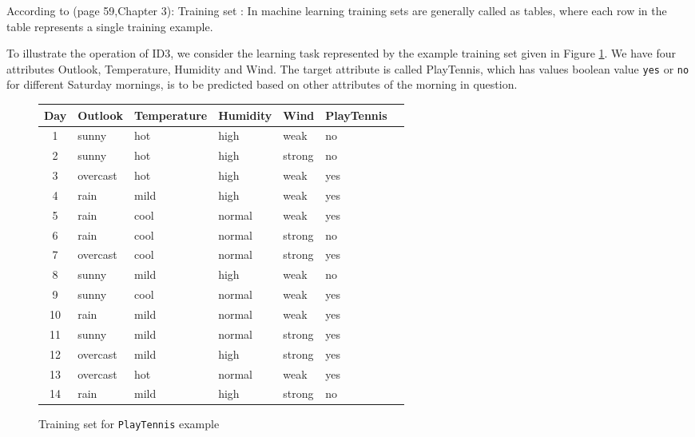 \documentclass{report}
\begin{document}
According to \cite{Mitchell1997MachineLearning}(page 59,Chapter 3): Training set : In machine learning training sets are generally called as tables, where each row in the table represents a single training example. 

To illustrate the operation of ID3, we consider the learning task represented by the example training set given in Figure \ref{fig:trainingplaytennis}. We have four attributes Outlook, Temperature, Humidity and Wind. The target attribute is called PlayTennis, which has values boolean value \texttt{yes} or \texttt{no} for different Saturday mornings, is to be predicted based on other attributes of the morning in question.
\begin{figure}[h]
  \centering
  \begin{tabular}{|c|l|l|l|l|l|l|}
    \hline
    Day & Outlook & Temperature & Humidity & Wind & PlayTennis\\
    \hline
    1 & sunny & hot & high & weak & no
    \\\hline
    2 & sunny & hot & high & strong & no
    \\\hline
    3 & overcast & hot & high & weak & yes
    \\\hline
    4 & rain & mild & high & weak & yes
    \\\hline
    5 & rain & cool & normal & weak & yes
    \\\hline
    6 & rain & cool & normal & strong & no
    \\\hline
    7 & overcast & cool & normal & strong & yes
    \\\hline
    8 & sunny & mild & high & weak & no
    \\\hline
    9 & sunny & cool & normal & weak & yes
    \\\hline
    10 & rain & mild & normal & weak & yes
    \\\hline
    11 & sunny & mild & normal & strong & yes
    \\\hline
    12 & overcast & mild & high & strong & yes
    \\\hline
    13 & overcast & hot & normal & weak & yes
    \\\hline
    14 & rain & mild & high & strong & no
    \\\hline
  \end{tabular}
  \caption{Training set for \texttt{PlayTennis} example}
  \label{fig:trainingplaytennis}
\end{figure}
\end{document}
